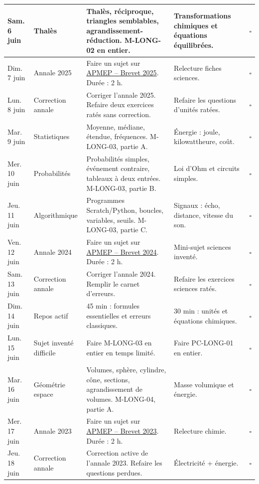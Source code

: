 \documentclass[11pt,a4paper]{article}
\newcounter{exercice}
\newcounter{correction}
\begin{document}
\begin{longtable}{|p{2.3cm}|p{3.2cm}|p{4.7cm}|p{4.7cm}|p{0.7cm}|}
\hline
Sam. 6 juin & Thalès & Thalès, réciproque, triangles semblables, agrandissement-réduction. M-LONG-02 en entier. & Transformations chimiques et équations équilibrées. & $\square$ \\
\hline
Dim. 7 juin & Annale 2025 & Faire un sujet sur \href{https://www.apmep.fr/Brevet-2025}{APMEP -- Brevet 2025}. Durée : 2 h. & Relecture fiches sciences. & $\square$ \\
\hline
Lun. 8 juin & Correction annale & Corriger l'annale 2025. Refaire deux exercices ratés sans correction. & Refaire les questions d'unités ratées. & $\square$ \\
\hline
Mar. 9 juin & Statistiques & Moyenne, médiane, étendue, fréquences. M-LONG-03, partie A. & Énergie : joule, kilowattheure, coût. & $\square$ \\
\hline
Mer. 10 juin & Probabilités & Probabilités simples, événement contraire, tableaux à deux entrées. M-LONG-03, partie B. & Loi d'Ohm et circuits simples. & $\square$ \\
\hline
Jeu. 11 juin & Algorithmique & Programmes Scratch/Python, boucles, variables, seuils. M-LONG-03, partie C. & Signaux : écho, distance, vitesse du son. & $\square$ \\
\hline
Ven. 12 juin & Annale 2024 & Faire un sujet sur \href{https://www.apmep.fr/Brevet-2024}{APMEP -- Brevet 2024}. Durée : 2 h. & Mini-sujet sciences inventé. & $\square$ \\
\hline
Sam. 13 juin & Correction annale & Corriger l'annale 2024. Remplir le carnet d'erreurs. & Refaire les exercices sciences ratés. & $\square$ \\
\hline
Dim. 14 juin & Repos actif & 45 min : formules essentielles et erreurs classiques. & 30 min : unités et équations chimiques. & $\square$ \\
\hline
Lun. 15 juin & Sujet inventé difficile & Faire M-LONG-03 en entier en temps limité. & Faire PC-LONG-01 en entier. & $\square$ \\
\hline
Mar. 16 juin & Géométrie espace & Volumes, sphère, cylindre, cône, sections, agrandissement de volumes. M-LONG-04, partie A. & Masse volumique et énergie. & $\square$ \\
\hline
Mer. 17 juin & Annale 2023 & Faire un sujet sur \href{https://www.apmep.fr/Brevet-2023}{APMEP -- Brevet 2023}. Durée : 2 h. & Relecture chimie. & $\square$ \\
\hline
Jeu. 18 juin & Correction annale & Correction active de l'annale 2023. Refaire les questions perdues. & Électricité + énergie. & $\square$ \\

\end{longtable}
\end{document}
